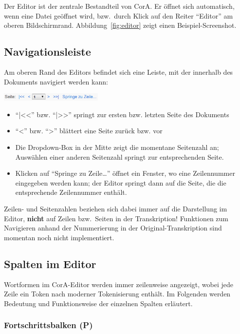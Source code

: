 \documentclass[11pt,a4paper,parskip=half]{scrartcl}
\begin{document}
Der Editor ist der zentrale Bestandteil von CorA.  Er öffnet sich
automatisch, wenn eine Datei geöffnet wird, bzw.\ durch Klick auf den
Reiter "`Editor"' am oberen Bildschirmrand.
Abbildung~\ref{fig:editor} zeigt einen Beispiel-Screenshot.

\subsection{Navigationsleiste}

Am oberen Rand des Editors befindet sich eine Leiste, mit der
innerhalb des Dokuments navigiert werden kann:

\begin{center}
  \includegraphics[height=15px]{img/navigation.png}
\end{center}

\begin{itemize}
\item "`|<{}<"' bzw. "`|>{}>"' springt zur ersten bzw. letzten Seite
  des Dokuments
\item "`<"' bzw. "`>"' blättert eine Seite zurück bzw. vor
\item Die Dropdown-Box in der Mitte zeigt die momentane Seitenzahl an;
  Auswählen einer anderen Seitenzahl springt zur entsprechenden Seite.
\item Klicken auf "`Springe zu Zeile\ldots{}"' öffnet ein Fenster, wo
  eine Zeilennummer eingegeben werden kann; der Editor springt dann
  auf die Seite, die die entsprechende Zeilennummer enthält.
\end{itemize}

Zeilen- und Seitenzahlen beziehen sich dabei immer auf die Darstellung
im Editor, \textbf{nicht} auf Zeilen bzw.\ Seiten in der
Transkription!  Funktionen zum Navigieren anhand der Nummerierung in
der Original-Transkription sind momentan noch nicht implementiert.

\subsection{Spalten im Editor}

Wortformen im CorA-Editor werden immer zeilenweise angezeigt, wobei
jede Zeile ein Token nach moderner Tokenisierung enthält.  Im
Folgenden werden Bedeutung und Funktionsweise der einzelnen Spalten
erläutert.

\subsubsection{Fortschrittsbalken (P)}
\end{document}
